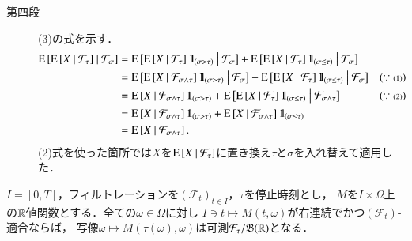 \begin{prf}
\begin{description}
			\item[第四段]
				(3)の式を示す．
				\begin{align}
					\cexp{\cexp{X}{\mathcal{F}_\tau}}{\mathcal{F}_\sigma}
					&= \cexp{\cexp{X}{\mathcal{F}_\tau}\defunc_{(\sigma > \tau)}}{\mathcal{F}_\sigma}
						+ \cexp{\cexp{X}{\mathcal{F}_\tau}\defunc_{(\sigma \leq \tau)}}{\mathcal{F}_\sigma} \\
					&= \cexp{\cexp{X}{\mathcal{F}_{\sigma \wedge \tau}}\defunc_{(\sigma > \tau)}}{\mathcal{F}_\sigma}
						+ \cexp{\cexp{X}{\mathcal{F}_\tau}\defunc_{(\sigma \leq \tau)}}{\mathcal{F}_\sigma} && (\scriptsize\because\mbox{(1)}) \\
					&= \cexp{X}{\mathcal{F}_{\sigma \wedge \tau}}\defunc_{(\sigma > \tau)}
						+ \cexp{\cexp{X}{\mathcal{F}_\tau}\defunc_{(\sigma \leq \tau)}}{\mathcal{F}_{\sigma \wedge \tau}} && (\scriptsize\because\mbox{(2)}) \\
					&= \cexp{X}{\mathcal{F}_{\sigma \wedge \tau}}\defunc_{(\sigma > \tau)} + \cexp{X}{\mathcal{F}_{\sigma \wedge \tau}}\defunc_{(\sigma \leq \tau)} \\
					&= \cexp{X}{\mathcal{F}_{\sigma \wedge \tau}}.
				\end{align}
				(2)式を使った箇所では$X$を$\cexp{X}{\mathcal{F}_\tau}$に置き換え$\tau$と$\sigma$を入れ替えて適用した．
		\end{description}
		\QED
	\end{prf}
	
	\begin{itembox}[l]{}
		\begin{thm}[停止時刻との合成写像の可測性]
			$I = [0,T]$，フィルトレーションを$(\mathcal{F}_t)_{t \in I}$，$\tau$を停止時刻とし，
			$M$を$I \times \Omega$上の$\R$値関数とする．全ての$\omega \in \Omega$に対し
			$I \ni t \longmapsto M(t,\omega)$が右連続でかつ$(\mathcal{F}_t)$-適合ならば，
			写像$\omega \longmapsto M(\tau(\omega),\omega)$は可測$\mathcal{F}_\tau/\borel{\R}$となる．
			\label{thm:measurability_of_stopping_time}
		\end{thm}
	\end{itembox}
	
